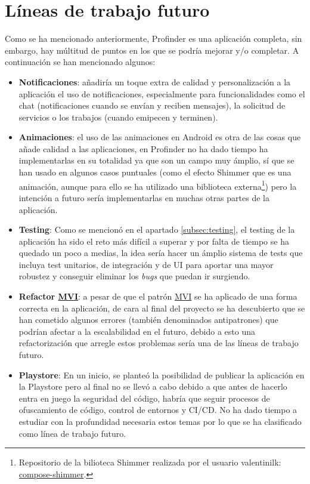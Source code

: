 \section{Líneas de trabajo futuro}
Como se ha mencionado anteriormente, Profinder es una aplicación completa, sin embargo, hay múltitud de puntos en los que se podría mejorar y/o completar. A continuación se han mencionado algunos:
\begin{itemize}
    \item \textbf{Notificaciones}: añadiría un toque extra de calidad y personalización a la aplicación el uso de notificaciones, especialmente para funcionalidades como el chat (notificaciones cuando se envían y reciben mensajes), la solicitud de servicios o los trabajos (cuando emipecen y terminen).
    \item \textbf{Animaciones}: el uso de las animaciones en Android es otra de las cosas que añade calidad a las aplicaciones, en Profinder no ha dado tiempo ha implementarlas en su totalidad ya que son un campo muy ámplio, sí que se han usado en algunos casos puntuales (como el efecto Shimmer que es una animación, aunque para ello se ha utilizado una biblioteca externa\footnote{Repositorio de la bilioteca Shimmer realizada por el usuario valentinilk: \href{https://github.com/valentinilk/compose-shimmer}{compose-shimmer}.}) pero la intención a futuro sería implementarlas en muchas otras partes de la aplicación.
    \item \textbf{Testing}: Como se mencionó en el apartado \ref{subsec:testing}, el testing de la aplicación ha sido el reto más difícil a superar y por falta de tiempo se ha quedado un poco a medias, la idea sería hacer un ámplio sistema de tests que incluya test unitarios, de integración y de UI para aportar una mayor robustez y conseguir eliminar los \textit{bugs} que puedan ir surgiendo.
    \item \textbf{Refactor  \hyperlink{subsec:mvi}{MVI}}: a pesar de que el patrón \hyperlink{subsec:mvi}{MVI} se ha aplicado de una forma correcta en la aplicación, de cara al final del proyecto se ha descubierto que se han cometido algunos errores (también denominados antipatrones) que podrían afectar a la escalabilidad en el futuro, debido a esto una refactorización que arregle estos problemas sería una de las líneas de trabajo futuro.
    \item \textbf{Playstore}: En un inicio, se planteó la posibilidad de publicar la aplicación en la Playstore pero al final no se llevó a cabo debido a que antes de hacerlo entra en juego la seguridad del código, habría que seguir procesos de ofuscamiento de código, control de entornos y CI/CD. No ha dado tiempo a estudiar con la profundidad necesaria estos temas por lo que se ha clasificado como línea de trabajo futuro.

\end{itemize}
